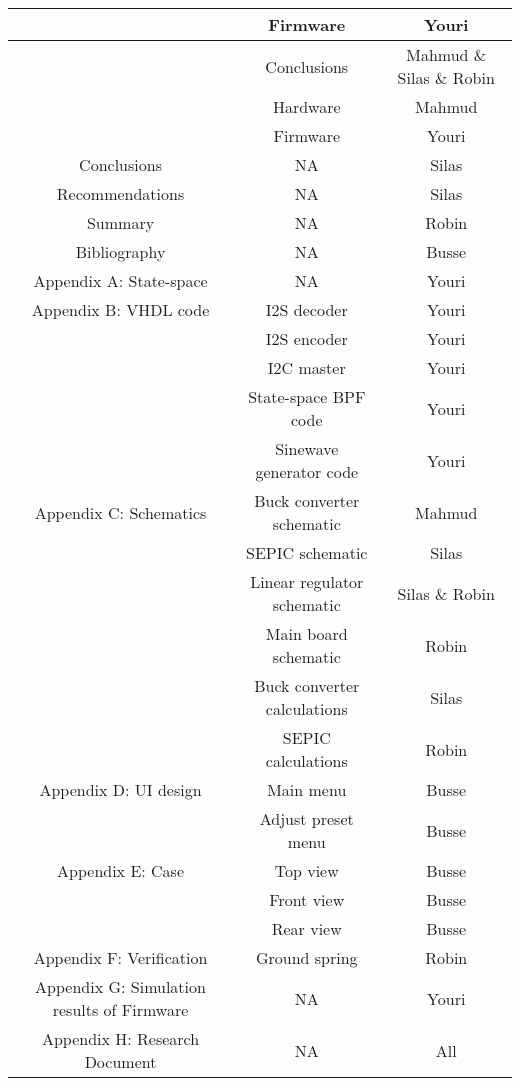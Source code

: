 \begin{justify}
\begin{longtable}{|c|c|c|}
												& Firmware						& Youri						\\ \hline
												& Conclusions					& Mahmud \& Silas \& Robin 	\\ \hline
												& Hardware						& Mahmud					\\ \hline
												& Firmware						& Youri						\\ \hline
	Conclusions									& NA							& Silas						\\ \hline
	Recommendations								& NA							& Silas						\\ \hline
	Summary										& NA							& Robin						\\ \hline
	Bibliography								& NA							& Busse						\\ \hline
	Appendix A: State-space						& NA							& Youri						\\ \hline
	Appendix B: VHDL code						& I2S decoder					& Youri						\\ \hline
												& I2S encoder					& Youri						\\ \hline
												& I2C master					& Youri						\\ \hline
												& State-space BPF code			& Youri						\\ \hline
												& Sinewave generator code		& Youri						\\ \hline
	Appendix C: Schematics						& Buck converter schematic		& Mahmud					\\ \hline
												& SEPIC schematic				& Silas						\\ \hline
												& Linear regulator schematic	& Silas	\& Robin			\\ \hline
												& Main board schematic			& Robin						\\ \hline
												& Buck converter calculations	& Silas						\\ \hline
												& SEPIC calculations			& Robin						\\ \hline
	Appendix D: UI design						& Main menu						& Busse						\\ \hline
												& Adjust preset menu			& Busse						\\ \hline
	Appendix E: Case							& Top view						& Busse						\\ \hline
												& Front view					& Busse						\\ \hline
												& Rear view						& Busse						\\ \hline
	Appendix F: Verification					& Ground spring					& Robin						\\ \hline
	Appendix G: Simulation results of Firmware	& NA							& Youri						\\ \hline
	Appendix H: Research Document				& NA							& All						\\ \hline


\end{longtable}
\end{justify}
